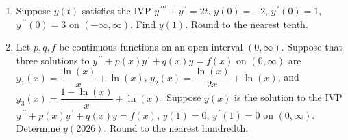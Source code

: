 \documentclass{ximera}
\begin{document}
\begin{enumerate}[label=(\arabic*)]



\newpage


\item Suppose $y(t)$ satisfies the IVP $y^{\,\prime\prime\prime}+y^{\,\prime}=2t$, $y(0)=-2$, $y^{\,\prime}(0)=1$, $y^{\,\prime\prime}(0)=3$  on $(-\infty,\infty)$.  Find $y(1)$.  Round to the nearest tenth. 




\item Let $p,q,f$ be continuous functions on an open interval $(0,\infty)$. Suppose that three solutions to $y^{\,\prime\prime}+p(x)y^{\,\prime}+q(x)y=f(x)$ on $(0,\infty)$ are \\$y_1(x)=\dfrac{\ln{(x)}}{x}+\ln{(x)}$, $y_2(x)=\dfrac{\ln{(x)}}{2x}+\ln{(x)}$, and \\$y_3(x)=\dfrac{1-\ln{(x)}}{x}+\ln{(x)}$.  Suppose $y(x)$ is the solution to the IVP $y^{\,\prime\prime}+p(x)y^{\,\prime}+q(x)y=f(x)$, $y(1)=0$, $y^{\,\prime}(1)=0$ on $(0,\infty)$.  Determine $y(2026)$.  Round to the nearest hundredth.









\end{enumerate}
\end{document}
